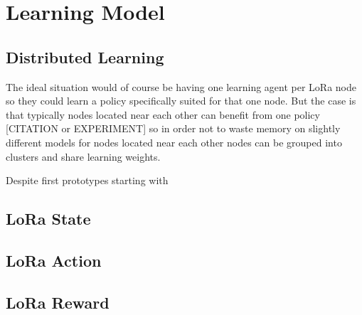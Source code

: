









\chapter{Learning Model}
\section{Distributed Learning}

The ideal situation would of course be having one learning agent 
per LoRa node so they could learn a policy specifically suited for
that one node. But the case is that typically nodes located 
near each other can benefit from one policy [CITATION or EXPERIMENT]
so in order not to waste memory on slightly different models 
for nodes located near each other nodes can be grouped into clusters
and share learning weights.



Despite first prototypes starting with 

\section{LoRa State}
\section{LoRa Action}
\section{LoRa Reward}

